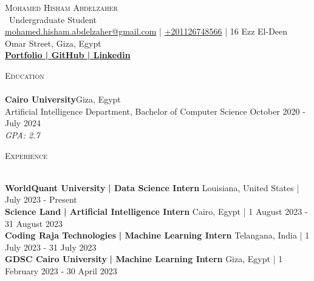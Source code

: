 \documentclass[a4paper]{article}
\newcommand{\lineunder} {
    \vspace*{-8pt} \\
    \hspace*{-18pt} \hrulefill \\
}
\newcommand{\header} [1] {
    {\hspace*{-18pt}\vspace*{6pt} \textsc{#1}}
    \vspace*{-6pt} \lineunder
}
\begin{document}
    \vspace*{-40pt}

    

%
%
  \vspace*{-2pt}
  \begin{center}
    {\Huge \scshape {Mohamed Hisham Abdelzaher}}\\
    \vspace*{2pt}
    \ {Undergraduate Student}\\
    \vspace*{2pt}
    \href{mailto:mohamed.hisham.abdelzaher@gmail.com}{mohamed.hisham.abdelzaher@gmail.com} | \href{tel:+201126748566}{+201126748566} | 16 Ezz El-Deen Omar Street, Giza, Egypt\\
    \vspace*{2pt}
    \textbf{\href{https://mh0386.github.io}{Portfolio | }}\textbf{\href{https://github.com/MH0386}{GitHub | }}\textbf{\href{https://linkedin.com/in/MH0386}{Linkedin}}\\
  \end{center}



      \header{Education}
      \vspace{2mm}
      \textbf{Cairo University}\hfill Giza, Egypt\\
Artificial Intelligence Department, Bachelor of Computer Science \hfill October 2020 - July 2024\\
{\sl GPA: 2.7}\\
\vspace{2mm}

%
%
  \header{Experience}
  \vspace{2mm}

  \textbf{WorldQuant University}\textbf{ | Data Science Intern} \hfill Louisiana, United States | July 2023 - Present\\
  \textbf{Science Land}\textbf{ | Artificial Intelligence Intern} \hfill Cairo, Egypt | 1 August 2023 - 31 August 2023\\
  \textbf{Coding Raja Technologies}\textbf{ | Machine Learning Intern} \hfill Telangana, India | 1 July 2023 - 31 July 2023\\
  \textbf{GDSC Cairo University}\textbf{ | Machine Learning Intern} \hfill Giza, Egypt | 1 February 2023 - 30 April 2023\\
\end{document}
